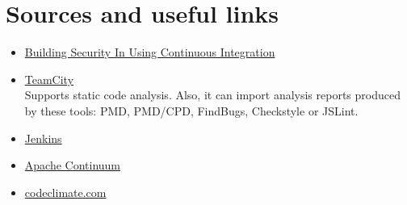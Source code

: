 \documentclass[conference]{IEEEtran}
\begin{document}
\section{Sources and useful links}
\begin{itemize}
	\item \href{http://www.crosstalkonline.org/storage/issue-archives/2010/201003/201003-Stiehm.pdf}{Building Security In Using Continuous Integration}
	\item \href{http://www.jetbrains.com/teamcity}{TeamCity}\\
	Supports static code analysis. Also, it can import analysis reports produced by these tools: PMD, PMD/CPD, FindBugs, Checkstyle or JSLint.
	\item \href{http://jenkins-ci.org}{Jenkins}
	\item \href{http://continuum.apache.org}{Apache Continuum}	
	\item \href{http://codeclimate.com}{codeclimate.com}
\end{itemize}






\end{document}
